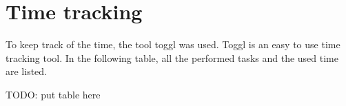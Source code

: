 \section{Time tracking}
    \label{sec:Time tracking}

To keep track of the time, the tool toggl was used. Toggl is an easy to use time tracking tool. In the following table, all the performed tasks and the used time are listed.



TODO: put table here


